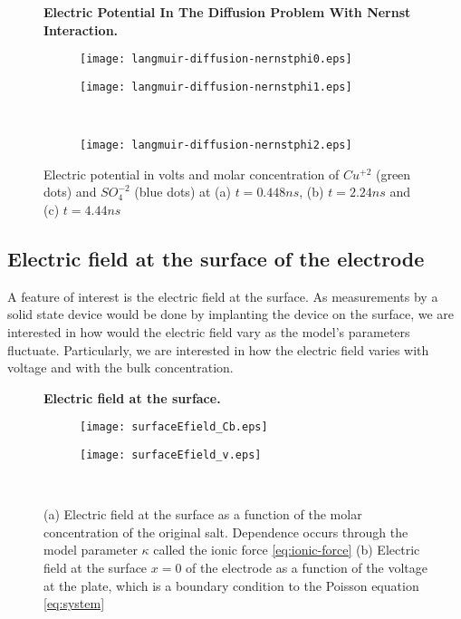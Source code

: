 \begin{figure}[htbp]
\centering
\textbf{Electric Potential In The Diffusion Problem With Nernst Interaction.}\par\medskip
\begin{subfigure}{.5\linewidth}
\centering
\texttt{[image: langmuir-diffusion-nernstphi0.eps]}
\caption{}
\label{fig:ef1}
\end{subfigure}%
\begin{subfigure}{.5\linewidth}
\centering
\texttt{[image: langmuir-diffusion-nernstphi1.eps]}
\caption{}
\label{fig:ef2}
\end{subfigure}\\[1ex]
\begin{subfigure}{\linewidth}
\centering
\texttt{[image: langmuir-diffusion-nernstphi2.eps]}
\caption{}
\label{fig:ef3}
\end{subfigure}
\caption{Electric potential in volts and molar concentration of $Cu^{+2}$ (green dots) and $SO_4^{-2}$ (blue dots) at (a) $t = 0.448 ns$, (b) $t = 2.24 ns$ and (c) $t = 4.44 ns$}
\label{fig:test}
\end{figure}


\newpage
\subsection{Electric field at the surface of the electrode}

A feature of interest is the electric field at the surface. As measurements by a solid state device would be done by implanting the device on the surface, we are interested in how would the electric field vary as the model's parameters fluctuate. Particularly, we are interested in how the electric field varies with voltage and with the bulk concentration.

\begin{figure}[htbp]
\centering
\textbf{Electric field at the surface.}\par\medskip
\begin{subfigure}{.5\linewidth}
\centering
\texttt{[image: surfaceEfield\_Cb.eps]}
\caption{}
\label{fig:ef1}
\end{subfigure}%
\begin{subfigure}{.5\linewidth}
\centering
\texttt{[image: surfaceEfield\_v.eps]}
\caption{}
\label{fig:ef2}
\end{subfigure}\\[1ex]
\caption{(a) Electric field at the surface as a function of the molar concentration of the original salt. Dependence occurs through the model parameter $\kappa$ called the ionic force \ref{eq:ionic-force} (b) Electric field at the surface $x=0$ of the electrode as a function of the voltage at the plate, which is a boundary condition to the Poisson equation \ref{eq:system}}
\label{fig:test}
\end{figure}




